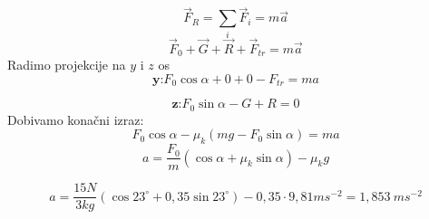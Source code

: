 

$$ \vec{F}_R=\sum_i \vec{F}_i=m\vec{a}$$
$$\vec{F}_0+\vec{G}+\vec{R}+\vec{F}_{tr}=m\vec{a} $$
Radimo projekcije na $y$ i $z$ os
$$ \textbf{y:}  F_0\cos\alpha+ 0 +0 -F_{tr}=ma 
$$
 
$$  \textbf{z:} F_0\sin\alpha-G + R =0
$$
Dobivamo konačni izraz:
$$
F_0\cos\alpha-\mu_k(mg-F_0\sin\alpha)=ma
$$
$$ a=\frac{F_0}{m}\left(\cos\alpha + \mu_k\sin\alpha\right) -\mu_k g $$

$$a = \frac{15N}{3kg}\left(\cos23^\circ + 0,35\sin23^\circ  \right) -0,35\cdot 9,81ms^{-2} =1,853\ ms^{-2} $$





